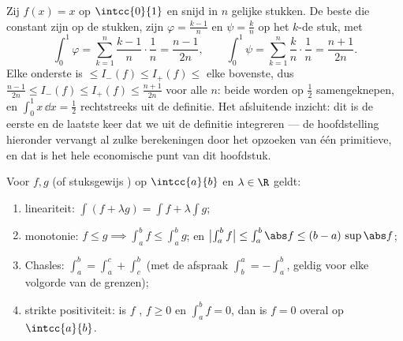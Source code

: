 \begin{example}\label{ex:b1:integration:defcompute}
Zij $f(x) = x$ op $\intcc{0}{1}$ en snijd in $n$ gelijke stukken.
De beste  die constant zijn op de stukken, zijn
$\varphi = \frac{k-1}{n}$ en $\psi = \frac kn$ op het $k$-de
stuk, met
\[
\int_0^1 \varphi = \sum_{k=1}^{n} \frac{k-1}{n}\cdot\frac1n
= \frac{n-1}{2n},
\qquad
\int_0^1 \psi = \sum_{k=1}^{n} \frac{k}{n}\cdot\frac1n
= \frac{n+1}{2n} .
\]
Elke onderste  is $\leq I_-(f) \leq I_+(f) \leq$ elke
bovenste, dus $\frac{n-1}{2n} \leq I_-(f) \leq I_+(f) \leq
\frac{n+1}{2n}$ voor alle $n$: beide worden op $\frac12$
samengeknepen, en $\int_0^1 x\,\dd x = \frac12$ rechtstreeks uit
de definitie. Het afsluitende inzicht: dit is de eerste en de
laatste keer dat we uit de definitie integreren --- de
hoofdstelling hieronder vervangt al zulke berekeningen door het
opzoeken van één primitieve, en dat is het hele economische punt
van dit hoofdstuk.
\end{example}

\begin{theorem}[Eigenschappen]\label{thm:b1:integration:props}
Voor $f, g$  (of stuksgewijs ) op $\intcc{a}{b}$ en
$\lambda \in \R$ geldt:
\begin{enumerate}
  \item lineariteit: $\int (f + \lambda g) = \int f + \lambda \int g$;
  \item monotonie: $f \leq g \implies \int_a^b f \leq \int_a^b g$; en
        $\bigl|\int_a^b f\bigr| \leq \int_a^b \abs f \leq (b -
        a)\, \sup\abs f$;
  \item Chasles: $\int_a^b = \int_a^c + \int_c^b$ (met de afspraak
        $\int_b^a = -\int_a^b$, geldig voor elke volgorde van de
        grenzen);
  \item strikte positiviteit: is $f$ , $f \geq 0$ en
        $\int_a^b f = 0$, dan is $f = 0$ overal op $\intcc{a}{b}$.
\end{enumerate}
\end{theorem}

